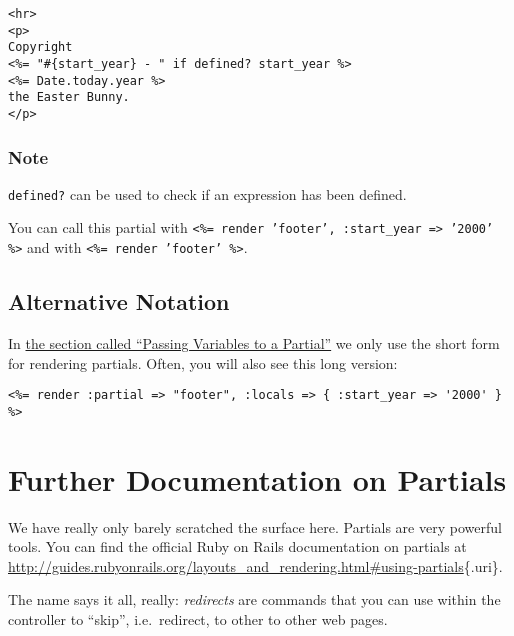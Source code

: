 \documentclass[a4paper]{book}
\newcommand{\chap}[1]{\newpage\thispagestyle{empty}\chapter{#1}\label{chap:\thechapter}}
\begin{document}
\begin{shaded}\begin{verbatim}
<hr>
<p>
Copyright
<%= "#{start_year} - " if defined? start_year %>
<%= Date.today.year %>
the Easter Bunny.
</p>
\end{verbatim}\end{shaded}

\subsection{Note}\label{note-17}

\texttt{defined?} can be used to check if an expression has been defined.

You can call this partial with \texttt{\textless{}\%= render 'footer',         :start\_year =\textgreater{} '2000' \%\textgreater{}} and with \texttt{\textless{}\%= render         'footer' \%\textgreater{}}.

\section{Alternative Notation}\label{alternative-notation}

In \hyperref[partialsux5flocaleux5fvariables]{the section called “Passing Variables to a Partial”} we only use the short form for rendering partials. Often, you will also see this long version:

\begin{shaded}\begin{verbatim}
<%= render :partial => "footer", :locals => { :start_year => '2000' } %>
\end{verbatim}\end{shaded}

\chap{Further Documentation on Partials}\label{further-documentation-on-partials}

We have really only barely scratched the surface here. Partials are very powerful tools. You can find the official Ruby on Rails documentation on partials at \url{http://guides.rubyonrails.org/layouts_and_rendering.html\#using-partials}\{.uri\}.


The name says it all, really: \emph{redirects} are commands that you can use within the controller to “skip”, i.e.~redirect, to other to other web pages.
\end{document}
